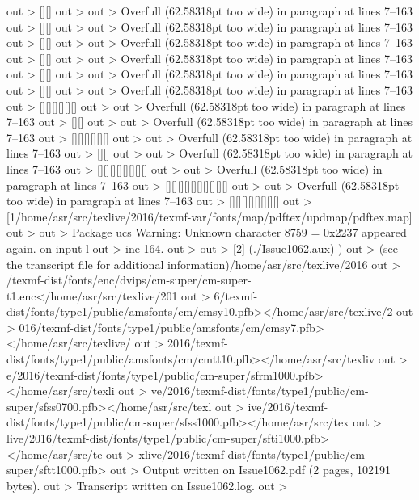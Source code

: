 out >  [][] 
out >
out > Overfull \hbox (62.58318pt too wide) in paragraph at lines 7--163
out >  [][] 
out >
out > Overfull \hbox (62.58318pt too wide) in paragraph at lines 7--163
out >  [][] 
out >
out > Overfull \hbox (62.58318pt too wide) in paragraph at lines 7--163
out >  [][] 
out >
out > Overfull \hbox (62.58318pt too wide) in paragraph at lines 7--163
out >  [][] 
out >
out > Overfull \hbox (62.58318pt too wide) in paragraph at lines 7--163
out >  [][] 
out >
out > Overfull \hbox (62.58318pt too wide) in paragraph at lines 7--163
out >  [][][][][][] 
out >
out > Overfull \hbox (62.58318pt too wide) in paragraph at lines 7--163
out >  [][] 
out >
out > Overfull \hbox (62.58318pt too wide) in paragraph at lines 7--163
out >  [][][][][][] 
out >
out > Overfull \hbox (62.58318pt too wide) in paragraph at lines 7--163
out >  [][] 
out >
out > Overfull \hbox (62.58318pt too wide) in paragraph at lines 7--163
out >  [][][][][][][][] 
out >
out > Overfull \hbox (62.58318pt too wide) in paragraph at lines 7--163
out >  [][][][][][][][][][] 
out >
out > Overfull \hbox (62.58318pt too wide) in paragraph at lines 7--163
out >  [][][][][][][][] 
out > [1{/home/asr/src/texlive/2016/texmf-var/fonts/map/pdftex/updmap/pdftex.map}]
out >
out > Package ucs Warning: Unknown character 8759 = 0x2237 appeared again. on input l
out > ine 164.
out >
out > [2] (./Issue1062.aux) )
out > (see the transcript file for additional information){/home/asr/src/texlive/2016
out > /texmf-dist/fonts/enc/dvips/cm-super/cm-super-t1.enc}</home/asr/src/texlive/201
out > 6/texmf-dist/fonts/type1/public/amsfonts/cm/cmsy10.pfb></home/asr/src/texlive/2
out > 016/texmf-dist/fonts/type1/public/amsfonts/cm/cmsy7.pfb></home/asr/src/texlive/
out > 2016/texmf-dist/fonts/type1/public/amsfonts/cm/cmtt10.pfb></home/asr/src/texliv
out > e/2016/texmf-dist/fonts/type1/public/cm-super/sfrm1000.pfb></home/asr/src/texli
out > ve/2016/texmf-dist/fonts/type1/public/cm-super/sfss0700.pfb></home/asr/src/texl
out > ive/2016/texmf-dist/fonts/type1/public/cm-super/sfss1000.pfb></home/asr/src/tex
out > live/2016/texmf-dist/fonts/type1/public/cm-super/sfti1000.pfb></home/asr/src/te
out > xlive/2016/texmf-dist/fonts/type1/public/cm-super/sftt1000.pfb>
out > Output written on Issue1062.pdf (2 pages, 102191 bytes).
out > Transcript written on Issue1062.log.
out >
